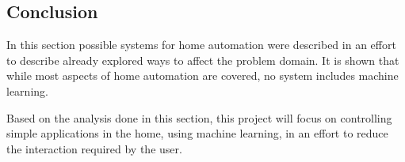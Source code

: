 \subsection{Conclusion}
In this section possible systems for home automation were described in an effort to describe already explored ways to affect the problem domain. It is shown that while most aspects of home automation are covered, no system includes machine learning.

Based on the analysis done in this section, this project will focus on controlling simple applications in the home, using machine learning, in an effort to reduce the interaction required by the user.
